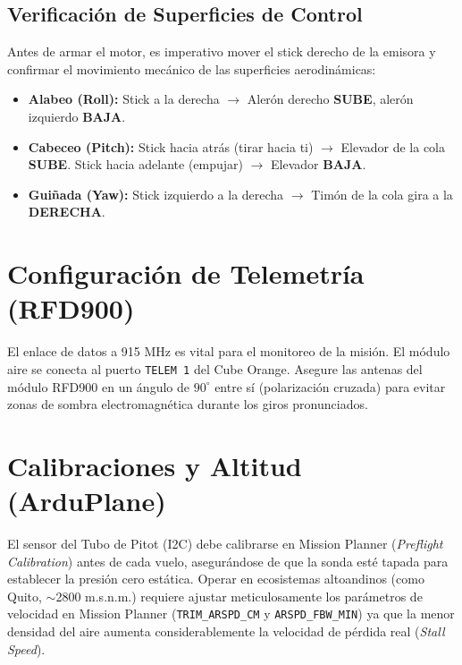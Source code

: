 \documentclass[11pt,a4paper]{article}
\begin{document}
\subsection{Verificación de Superficies de Control}
Antes de armar el motor, es imperativo mover el stick derecho de la emisora y confirmar el movimiento mecánico de las superficies aerodinámicas:
\begin{itemize}[itemsep=1ex]
    \item \textbf{Alabeo (Roll):} Stick a la derecha $\rightarrow$ Alerón derecho \textbf{SUBE}, alerón izquierdo \textbf{BAJA}.
    \item \textbf{Cabeceo (Pitch):} Stick hacia atrás (tirar hacia ti) $\rightarrow$ Elevador de la cola \textbf{SUBE}. Stick hacia adelante (empujar) $\rightarrow$ Elevador \textbf{BAJA}.
    \item \textbf{Guiñada (Yaw):} Stick izquierdo a la derecha $\rightarrow$ Timón de la cola gira a la \textbf{DERECHA}.
\end{itemize}

\section{Configuración de Telemetría (RFD900)}
El enlace de datos a 915 MHz es vital para el monitoreo de la misión. El módulo aire se conecta al puerto \texttt{TELEM 1} del Cube Orange. Asegure las antenas del módulo RFD900 en un ángulo de $90^\circ$ entre sí (polarización cruzada) para evitar zonas de sombra electromagnética durante los giros pronunciados.

\section{Calibraciones y Altitud (ArduPlane)}
El sensor del Tubo de Pitot (I2C) debe calibrarse en Mission Planner (\textit{Preflight Calibration}) antes de cada vuelo, asegurándose de que la sonda esté tapada para establecer la presión cero estática.
\newline
\newline
Operar en ecosistemas altoandinos (como Quito, $\sim$2800 m.s.n.m.) requiere ajustar meticulosamente los parámetros de velocidad en Mission Planner (\texttt{TRIM\_ARSPD\_CM} y \texttt{ARSPD\_FBW\_MIN}) ya que la menor densidad del aire aumenta considerablemente la velocidad de pérdida real (\textit{Stall Speed}).
\end{document}
